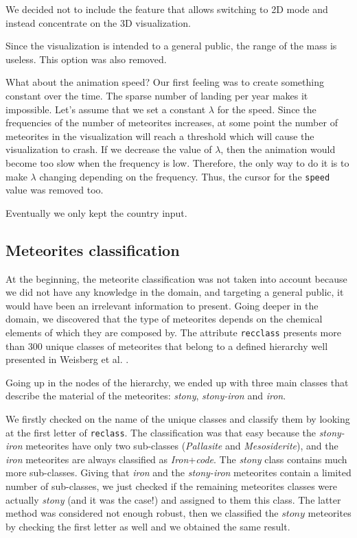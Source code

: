 \documentclass[10pt,conference,compsocconf]{IEEEtran}
\begin{document}
We decided not to include the feature that allows switching to 2D mode and instead concentrate on the 3D visualization.

Since the visualization is intended to a general public, the range of the mass is useless. This option was also removed.

What about the animation speed? Our first feeling was to create something constant over the time. The sparse number of landing per year makes it impossible. Let's assume that we set a constant $\lambda$ for the speed. Since the frequencies of the number of meteorites increases, at some point the number of meteorites in the visualization will reach a threshold which will cause the visualization to crash. If we decrease the value of $\lambda$, then the animation would become too slow when the frequency is low. Therefore, the only way to do it is to make $\lambda$ changing depending on the frequency. Thus, the cursor for the \texttt{speed} value was removed too.

Eventually we only kept the country input.

\subsection{Meteorites classification}

At the beginning, the meteorite classification was not taken into account because we did not have any knowledge in the domain, and targeting a general public, it would have been an irrelevant information to present. Going deeper in the domain, we discovered that the type of meteorites depends on the chemical elements of which they are composed by. The attribute \texttt{recclass} presents more than $300$ unique classes of meteorites that belong to a defined hierarchy well presented in Weisberg et al.  \cite{weisberg_systematics_2006}.

Going up in the nodes of the hierarchy, we ended up with three main classes that describe the material of the meteorites: \textit{stony}, \textit{stony-iron} and \textit{iron}.
 
We firstly checked on the name of the unique classes and classify them by looking at the first letter of \texttt{reclass}. The classification was that easy because the \textit{stony-iron} meteorites have only two sub-classes (\textit{Pallasite} and \textit{Mesosiderite}), and the \textit{iron} meteorites are always classified as \textit{Iron}+\textit{code}. The \textit{stony} class contains much more sub-classes. Giving that \textit{iron} and the \textit{stony-iron} meteorites contain a limited number of sub-classes, we just checked if the remaining meteorites classes were actually \textit{stony} (and it was the case!) and assigned to them this class. The latter method was considered not enough robust, then we classified the $stony$ meteorites by checking the first letter as well and we obtained the same result.
\end{document}
